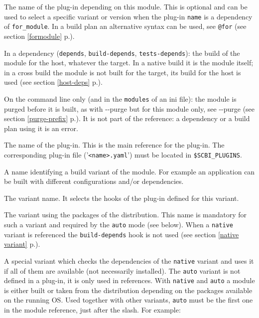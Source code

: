 \documentclass[a4paper,12pt,twoside]{article}
\newcommand{\code}[1]{\texttt{#1}}
\newcommand{\seeref}[1]{see section \ref{#1} p.\pageref{#1}}
\newcommand{\file}[1]{'{\texttt{#1}}'}
\newcommand{\ddash}{-{}-}
\begin{document}
\begin{description}[style=nextline]
	\item[for\_module] The name of the plug-in depending on this module. This is optional and can be used to select a specific variant or version when the plug-in \code{name} is a dependency of \code{for\_module}. In a build plan an alternative syntax can be used, see \code{@for} (\seeref{formodule}).

	\item[host@] In a dependency (\code{depends}, \code{build-depends}, \code{tests-depends}): the build of the module for the host, whatever the target. In a native build it is the module itself; in a cross build the module is not built for the target, its build for the host is used (\seeref{host-deps}).

	\item[purge@] On the command line only (and in the \code{modules} of an ini file): the module is purged before it is built, as with \ddash{}purge but for this module only, see \ddash{}purge (\seeref{purge-prefix}). It is not part of the reference: a dependency or a build plan using it is an error.

	\item[name] The name of the plug-in. This is the main reference for the plug-in. The corresponding plug-in file (\file{<name>.yaml}) must be located in \code{\$SCBI\_PLUGINS}.

	\item[variant] \label{variant}A name identifying a build variant of the module. For example an application can be built with different configurations and/or dependencies.

	\begin{description}[font=\texttt]
		\item[<ID>] The variant name. It selects the hooks of the plug-in defined for this variant.

		\item[native] The variant using the packages of the distribution. This name is mandatory for such a variant and required by the \code{auto} mode (see below). When a \code{native} variant is referenced the \code{build-depends} hook is not used (\seeref{native variant}).

		\item[auto] A special variant which checks the dependencies of the \code{native} variant and uses it if all of them are available (not necessarily installed). The \code{auto} variant is not defined in a plug-in, it is only used in references. With \code{native} and \code{auto} a module is either built or taken from the distribution depending on the packages available on the running OS. Used together with other variants, \code{auto} must be the first one in the module reference, just after the slash. For example:


\end{description}
\end{description}
\end{document}
